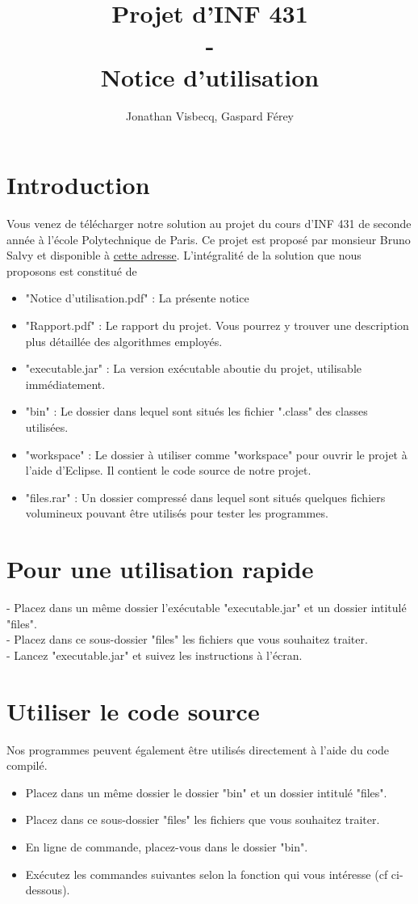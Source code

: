 \documentclass[12pt,a4paper,titlepage]{article}
\author{Jonathan Visbecq, Gaspard Férey}
\title{Projet d'INF 431 \\ - \\ Notice d'utilisation}
\begin{document}
\maketitle

\section{Introduction}
Vous venez de télécharger notre solution au projet du cours d'INF 431 de seconde année à l'école Polytechnique de Paris. Ce projet est proposé par monsieur Bruno Salvy et disponible à \href{http://perso.ens-lyon.fr/bruno.salvy/INF431/Projet/INF431_-_Projet_Informatique.html}{cette adresse}.
L'intégralité de la solution que nous proposons est constitué de
\begin{itemize}
\item "Notice d'utilisation.pdf" : La présente notice
\item "Rapport.pdf" : Le rapport du projet. Vous pourrez y trouver une description plus détaillée des algorithmes employés. 
\item "executable.jar" : La version exécutable aboutie du projet, utilisable immédiatement.
\item "bin" : Le dossier dans lequel sont situés les fichier ".class" des classes utilisées.
\item "workspace" : Le dossier à utiliser comme "workspace" pour ouvrir le projet à l'aide d'Eclipse. Il contient le code source de notre projet.
\item "files.rar" : Un dossier compressé dans lequel sont situés quelques fichiers volumineux pouvant être utilisés pour tester les programmes.
\end{itemize}


\section{Pour une utilisation rapide}
- Placez dans un même dossier l'exécutable "executable.jar" et un dossier intitulé "files".\\
- Placez dans ce sous-dossier "files" les fichiers que vous souhaitez traiter. \\
- Lancez "executable.jar" et suivez les instructions à l'écran.



\section{Utiliser le code source}
Nos programmes peuvent également être utilisés directement à l'aide du code compilé.
\begin{itemize}
\item Placez dans un même dossier le dossier "bin" et un dossier intitulé "files".
\item Placez dans ce sous-dossier "files" les fichiers que vous souhaitez traiter.
\item En ligne de commande, placez-vous dans le dossier "bin".
\item Exécutez les commandes suivantes selon la fonction qui vous intéresse (cf ci-dessous).
\end{itemize}
\end{document}
